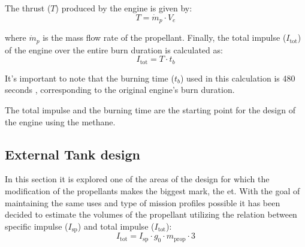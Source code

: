 The thrust (\( T \)) produced by the engine is given by:
\begin{equation*}
     T = \dot{m}_{p} \cdot V_{e}
\end{equation*}

where \( \dot{m}_{p} \) is the mass flow rate of the propellant.
Finally, the total impulse (\( I_{\text{tot}} \)) of the engine over the entire burn duration is calculated as:
\begin{equation}
I_{\text{tot}} = T \cdot t_b
\end{equation}

It's important to note that the burning time ($t_b$) used in this calculation is 480 seconds \cite{link3}, corresponding to the original engine's burn duration.

The total impulse and the burning time are the starting point for the design of the engine using the methane.

\subsection{External Tank design}
In this section it is explored one of the areas of the design for which the modification of the propellants makes the biggest mark, the \acrfull{et}.
With the goal of maintaining the same uses and type of mission profiles possible it has been decided to estimate the volumes of the propellant utilizing the relation between specific impulse ($I_{\text{sp}}$) and total impulse ($I_{\text{tot}}$):
\begin{equation}
I_{\text{tot}} = I_{\text{sp}} \cdot g_0 \cdot m_{\text{prop}} \cdot 3 
\end{equation}


